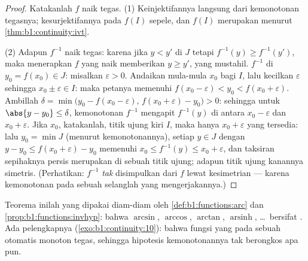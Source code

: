 \begin{proof}
Katakanlah $f$ naik tegas. (1) Keinjektifannya langsung dari
kemonotonan tegasnya; kesurjektifannya pada $f(I)$ sepele, dan $f(I)$
merupakan  menurut \cref{thm:b1:continuity:ivt}.

(2) Adapun $f^{-1}$ naik tegas: karena jika $y < y'$ di $J$ tetapi $f^{-1}(y)
\geq f^{-1}(y')$, maka menerapkan $f$ yang naik memberikan $y \geq y'$,
yang mustahil.  $f^{-1}$ di $y_0 = f(x_0) \in J$: misalkan
$\varepsilon > 0$. Andaikan mula-mula $x_0$  bagi $I$, lalu
kecilkan $\varepsilon$ sehingga $x_0 \pm \varepsilon \in I$: maka
petanya memenuhi $f(x_0 - \varepsilon) < y_0 < f(x_0 +
\varepsilon)$. Ambillah
$\delta = \min\bigl(y_0 - f(x_0 - \varepsilon),\, f(x_0 +
\varepsilon) - y_0\bigr) > 0$: sehingga untuk $\abs{y - y_0} \leq \delta$,
kemonotonan $f^{-1}$ mengapit $f^{-1}(y)$ di antara $x_0 -
\varepsilon$ dan $x_0 + \varepsilon$. Jika $x_0$, katakanlah, titik ujung
kiri $I$, maka hanya $x_0 + \varepsilon$ yang tersedia: lalu
$y_0 = \min J$ (menurut kemonotonannya), setiap $y \in J$ dengan $y - y_0
\leq f(x_0 + \varepsilon) - y_0$ memenuhi $x_0 \leq f^{-1}(y)
\leq x_0 + \varepsilon$, dan taksiran sepihaknya persis merupakan
 di sebuah titik ujung; adapun titik ujung kanannya simetris.
(Perhatikan:  $f^{-1}$ \emph{tak} disimpulkan dari
 $f$ lewat kesimetrian --- karena kemonotonan
pada sebuah selanglah yang mengerjakannya.)
\end{proof}

\begin{remark}
Teorema inilah yang dipakai diam-diam oleh \cref{def:b1:functions:arc} dan
\cref{prop:b1:functions:invhyp}: bahwa $\arcsin$, $\arccos$,
$\arctan$, $\operatorname{arsinh}$, \dots\ bersifat . Ada
pelengkapnya (\cref{exo:b1:continuity:10}): bahwa fungsi
\emph{} yang  pada sebuah  otomatis monoton
tegas, sehingga hipotesis kemonotonannya tak berongkos apa pun.
\end{remark}

